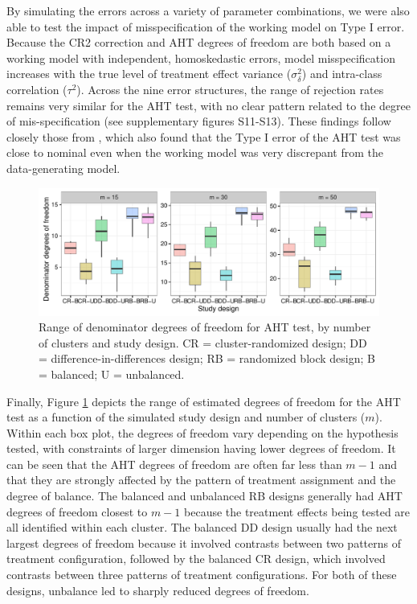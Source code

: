 \documentclass[12pt]{article}\usepackage[]{graphicx}\usepackage[]{color}
\newenvironment{knitrout}{}{} %
\begin{document}
By simulating the errors across a variety of parameter combinations, we were also able to test the impact of misspecification of the working model on Type I error.
Because the CR2 correction and AHT degrees of freedom are both based on a working model with independent, homoskedastic errors, model misspecification increases with the true level of treatment effect variance ($\sigma_\delta^2$) and intra-class correlation ($\tau^2$).
Across the nine error structures, the range of rejection rates remains very similar for the AHT test, with no clear pattern related to the degree of mis-specification (see supplementary figures S11-S13). 
These findings follow closely those from , which also found that the Type I error of the AHT test was close to nominal even when the working model was very discrepant from the data-generating model.

\begin{knitrout}
\color{fgcolor}\begin{figure}

{\centering \includegraphics[width=\linewidth]{CR_fig/df-1} 

}

\caption[Range of denominator degrees of freedom for AHT test, by number of clusters and study design]{Range of denominator degrees of freedom for AHT test, by number of clusters and study design. CR = cluster-randomized design; DD = difference-in-differences design; RB = randomized block design; B = balanced; U = unbalanced.}\label{fig:df}
\end{figure}


\end{knitrout}

Finally, Figure \ref{fig:df} depicts the range of estimated degrees of freedom for the AHT test as a function of the simulated study design and number of clusters ($m$). 
Within each box plot, the degrees of freedom vary depending on the hypothesis tested, with constraints of larger dimension having lower degrees of freedom. 
It can be seen that the AHT degrees of freedom are often far less than $m - 1$ and that they are strongly affected by the pattern of treatment assignment and the degree of balance. The balanced and unbalanced RB designs generally had AHT degrees of freedom closest to $m - 1$ because the treatment effects being tested are all identified within each cluster. 
The balanced DD design usually had the next largest degrees of freedom because it involved contrasts between two patterns of treatment configuration, followed by the balanced CR design, which involved contrasts between three patterns of treatment configurations. 
For both of these designs, unbalance led to sharply reduced degrees of freedom.
\end{document}
